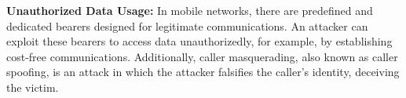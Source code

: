 \documentclass[english]{article}
\begin{document}
\textbf{Unauthorized Data Usage:} In mobile networks, there are predefined and dedicated
bearers designed for legitimate communications. An attacker can exploit these bearers to
access data unauthorizedly, for example, by establishing cost-free communications.
Additionally, caller masquerading, also known as caller spoofing, is an attack in which
the attacker falsifies the caller's identity, deceiving the victim.
\end{document}
